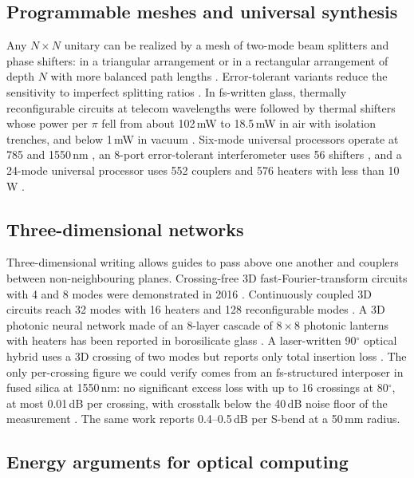 \documentclass[11pt,a4paper]{article}
\newcommand{\dB}{\,dB\xspace}
\begin{document}
\subsection{Programmable meshes and universal synthesis}

Any $N\times N$ unitary can be realized by a mesh of two-mode beam splitters and phase shifters: in a triangular arrangement \cite{Reck1994} or in a rectangular arrangement of depth $N$ with more balanced path lengths \cite{Clements2016}. Error-tolerant variants reduce the sensitivity to imperfect splitting ratios \cite{Saygin2020,Kondratyev2024}. In fs-written glass, thermally reconfigurable circuits at telecom wavelengths \cite{Flamini2015} were followed by thermal shifters whose power per $\pi$ fell from about 102\,mW to 18.5\,mW in air with isolation trenches, and below 1\,mW in vacuum \cite{Ceccarelli2019,Ceccarelli2020,Albiero2022,Ceccarelli2024,Lichtenegger2026}. Six-mode universal processors operate at 785 and 1550\,nm \cite{Pentangelo2024}, an 8-port error-tolerant interferometer uses 56 shifters \cite{Kondratyev2024}, and a 24-mode universal processor uses 552 couplers and 576 heaters with less than 10\,W \cite{Barzaghi2025}.

\subsection{Three-dimensional networks}

Three-dimensional writing allows guides to pass above one another and couplers between non-neighbouring planes. Crossing-free 3D fast-Fourier-transform circuits with 4 and 8 modes were demonstrated in 2016 \cite{Crespi2016}. Continuously coupled 3D circuits reach 32 modes with 16 heaters \cite{Hoch2022} and 128 reconfigurable modes \cite{DiMicco2026}. A 3D photonic neural network made of an 8-layer cascade of $8\times8$ photonic lanterns with heaters has been reported in borosilicate glass \cite{Cao2026}. A laser-written 90$^\circ$ optical hybrid uses a 3D crossing of two modes but reports only total insertion loss \cite{Peri2026}. The only per-crossing figure we could verify comes from an fs-structured interposer in fused silica at 1550\,nm: no significant excess loss with up to 16 crossings at 80$^\circ$, at most 0.01\dB per crossing, with crosstalk below the 40\dB noise floor of the measurement \cite{Djogo2026}. The same work reports 0.4--0.5\dB per S-bend at a 50\,mm radius.

\subsection{Energy arguments for optical computing}
\end{document}
